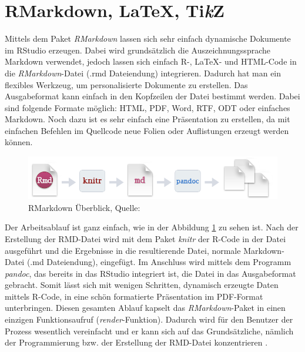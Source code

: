 \section{RMarkdown, \LaTeX, Ti\textit{k}Z}
\label{sec:RMarkdown}
Mittels dem Paket \emph{RMarkdown} lassen sich sehr einfach dynamische Dokumente im RStudio erzeugen. Dabei wird grundsätzlich die Auszeichnungssprache Markdown verwendet, jedoch lassen sich einfach R-, \LaTeX - und HTML-Code in die \emph{RMarkdown}-Datei (.rmd Dateiendung) integrieren. Dadurch hat man ein flexibles Werkzeug, um personalisierte Dokumente zu erstellen. Das Ausgabeformat kann einfach in den Kopfzeilen der Datei bestimmt werden. Dabei sind folgende Formate möglich: HTML, PDF, Word, RTF, ODT oder einfaches Markdown. Noch dazu ist es sehr einfach eine Präsentation zu erstellen, da mit einfachen Befehlen im Quellcode neue Folien oder Auflistungen erzeugt werden können.

\begin{figure}[t]
\centering
\includegraphics[width=\ScaleIfNeeded]{pictures/RMarkdown}
\caption{RMarkdown Überblick, Quelle: \cite{rmarkdown}}
\label{pic:RMarkdown}
\end{figure}

Der Arbeitsablauf ist ganz einfach, wie in der Abbildung \ref{pic:RMarkdown} zu sehen ist. Nach der Erstellung der RMD-Datei wird mit dem Paket \emph{knitr} der R-Code in der Datei ausgeführt und die Ergebnisse in die resultierende Datei, normale Markdown-Datei (.md Dateiendung), eingefügt. Im Anschluss wird mittels dem Programm \emph{pandoc}, das bereits in das RStudio integriert ist, die Datei in das Ausgabeformat gebracht. Somit lässt sich mit wenigen Schritten, dynamisch erzeugte Daten mittels R-Code, in eine schön formatierte Präsentation im PDF-Format unterbringen. Diesen gesamten Ablauf kapselt das \emph{RMarkdown}-Paket in einen einzigen Funktionsaufruf (\emph{render}-Funktion). Dadurch wird für den Benutzer der Prozess wesentlich vereinfacht und er kann sich auf das Grundsätzliche, nämlich der Programmierung bzw. der Erstellung der RMD-Datei konzentrieren \cite{rmarkdown}.

